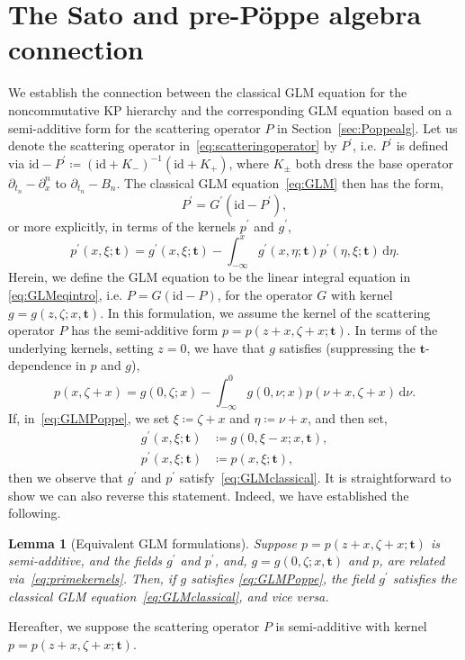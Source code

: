 \documentclass[5p,twocolumn]{elsarticle}
\newcommand*{\id}{{\mathrm{id}}}
\newcommand*{\pa}{{\partial}}
\newcommand*{\rd}{{\mathrm{d}}}
\newcommand*{\tbf}{\boldsymbol{t}}
\newtheorem{lemma}[theorem]{Lemma}
\begin{document}
\section{The Sato and pre-P\"oppe algebra connection}\label{sec:SatoPoppeconnection}
We establish the connection between the classical GLM equation for the noncommutative KP hierarchy
and the corresponding GLM equation based on a semi-additive form for the scattering operator $P$ in Section~\ref{sec:Poppealg}.
Let us denote the scattering operator in~\eqref{eq:scatteringoperator} by $P^\prime$, i.e.\/ $P^\prime$ is defined via $\id-P^\prime\coloneqq(\id+K_-)^{-1}(\id+K_+)$,
where $K_\pm$ both dress the base operator $\pa_{t_n}-\pa_x^n$ to $\pa_{t_n}-B_n$.
The classical GLM equation~\eqref{eq:GLM} then has the form,
\begin{equation*}
P^\prime=G^\prime(\id-P^\prime),
\end{equation*}
or more explicitly, in terms of the kernels $p^\prime$ and $g^\prime$,
\begin{equation}\label{eq:GLMclassical}
p^\prime(x,\xi;\tbf)=g^\prime(x,\xi;\tbf)-\int_{-\infty}^x g^\prime(x,\eta;\tbf)p^\prime(\eta,\xi;\tbf)\,\rd\eta.
\end{equation}
Herein, we define the GLM equation to be the linear integral equation in \eqref{eq:GLMeqintro}, i.e.\/ $P=G(\id-P)$, for the operator $G$ with kernel $g=g(z,\zeta;x,\tbf)$.
In this formulation, we assume the kernel of the scattering operator $P$ has the semi-additive form $p=p(z+x,\zeta+x;\tbf)$. 
In terms of the underlying kernels, setting $z=0$, we have that $g$ satisfies (suppressing the $\tbf$-dependence in $p$ and $g$),
\begin{equation}
  p(x,\zeta+x)=g(0,\zeta;x)-\int_{-\infty}^0\!\!g(0,\nu;x)p(\nu+x,\zeta+x)\,\rd\nu.\label{eq:GLMPoppe}
\end{equation}
If, in~\eqref{eq:GLMPoppe}, we set $\xi\coloneqq\zeta+x$ and $\eta\coloneqq\nu+x$, and then set,
\begin{subequations}\label{eq:primekernels}
\begin{align}
  g^\prime(x,\xi;\tbf)&\coloneqq g(0,\xi-x;x,\tbf),\\
  p^\prime(x,\xi;\tbf)&\coloneqq p(x,\xi;\tbf),\label{eq:pkernel}
\end{align}
\end{subequations}
then we observe that $g^\prime$ and $p^\prime$ satisfy~\eqref{eq:GLMclassical}.
It is straightforward to show we can also reverse this statement.
Indeed, we have established the following.
%
\begin{lemma}[Equivalent GLM formulations]
  Suppose $p=p(z+x,\zeta+x;\tbf)$ is semi-additive, and the fields $g^\prime$ and $p^\prime$, and, $g=g(0,\zeta;x,\tbf)$ and $p$, are related via~\eqref{eq:primekernels}.  
  Then, if $g$ satisfies \eqref{eq:GLMPoppe}, the field $g^\prime$ satisfies the classical GLM equation~\eqref{eq:GLMclassical}, and vice versa. 
\end{lemma}
%
Hereafter, we suppose the scattering operator $P$ is semi-additive with kernel $p=p(z+x,\zeta+x;\tbf)$.
\end{document}
